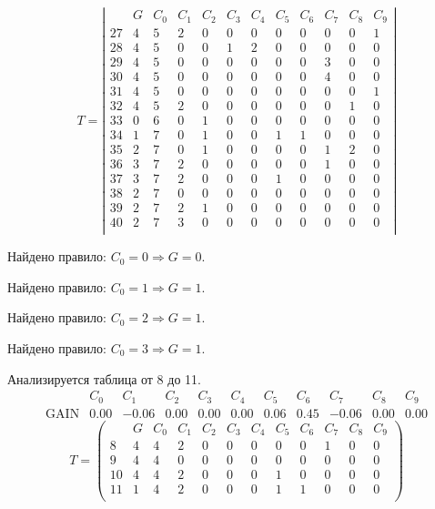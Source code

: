$$
T = \left| \begin{array}{lc|c|ccccccccc}
	& G & C_{0} & C_{1} & C_{2} & C_{3} & C_{4} & C_{5} & C_{6} & C_{7} & C_{8} & C_{9}\\
	27 & 4 & 5 & 2 & 0 & 0 & 0 & 0 & 0 & 0 & 0 & 1\\
	28 & 4 & 5 & 0 & 0 & 1 & 2 & 0 & 0 & 0 & 0 & 0\\
	29 & 4 & 5 & 0 & 0 & 0 & 0 & 0 & 0 & 3 & 0 & 0\\
	30 & 4 & 5 & 0 & 0 & 0 & 0 & 0 & 0 & 4 & 0 & 0\\
	31 & 4 & 5 & 0 & 0 & 0 & 0 & 0 & 0 & 0 & 0 & 1\\
	32 & 4 & 5 & 2 & 0 & 0 & 0 & 0 & 0 & 0 & 1 & 0\\
	33 & 0 & 6 & 0 & 1 & 0 & 0 & 0 & 0 & 0 & 0 & 0\\
	34 & 1 & 7 & 0 & 1 & 0 & 0 & 1 & 1 & 0 & 0 & 0\\
	35 & 2 & 7 & 0 & 1 & 0 & 0 & 0 & 0 & 1 & 2 & 0\\
	36 & 3 & 7 & 2 & 0 & 0 & 0 & 0 & 0 & 1 & 0 & 0\\
	37 & 3 & 7 & 2 & 0 & 0 & 0 & 1 & 0 & 0 & 0 & 0\\
	38 & 2 & 7 & 0 & 0 & 0 & 0 & 0 & 0 & 0 & 0 & 0\\
	39 & 2 & 7 & 2 & 1 & 0 & 0 & 0 & 0 & 0 & 0 & 0\\
	40 & 2 & 7 & 3 & 0 & 0 & 0 & 0 & 0 & 0 & 0 & 0\\
\end{array} \right|
$$

Найдено правило: $C_{0} = 0 \Longrightarrow G = 0$.

Найдено правило: $C_{0} = 1 \Longrightarrow G = 1$.

Найдено правило: $C_{0} = 2 \Longrightarrow G = 1$.

Найдено правило: $C_{0} = 3 \Longrightarrow G = 1$.

Анализируется таблица от 8 до 11.
$$ 
\begin{array}{lcccccc|c|ccc}
	  & C_{0} & C_{1} & C_{2} & C_{3} & C_{4} & C_{5} & C_{6} & C_{7} & C_{8} & C_{9}\\
 \textrm{GAIN} & 0.00 & -0.06 & 0.00 & 0.00 & 0.00 & 0.06 & 0.45 & -0.06 & 0.00 & 0.00
\end{array}
 $$
$$
T = \left( \begin{array}{lccccccc|c|ccc}
	 & G & C_{0} & C_{1} & C_{2} & C_{3} & C_{4} & C_{5} & C_{6} & C_{7} & C_{8} & C_{9}\\
	8 & 4 & 4 & 2 & 0 & 0 & 0 & 0 & 0 & 1 & 0 & 0\\
	9 & 4 & 4 & 0 & 0 & 0 & 0 & 0 & 0 & 0 & 0 & 0\\
	10 & 4 & 4 & 2 & 0 & 0 & 0 & 1 & 0 & 0 & 0 & 0\\
	11 & 1 & 4 & 2 & 0 & 0 & 0 & 1 & 1 & 0 & 0 & 0\\
\end{array} \right)
$$

